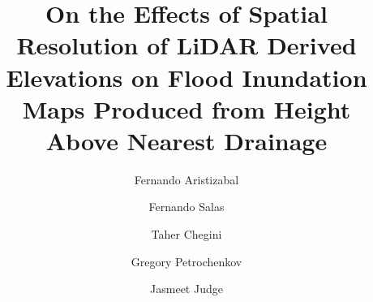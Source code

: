 \documentclass[preprint,review,12pt]{dependencies/elsarticle}
\begin{document}
%
\begin{frontmatter}
%
%


\title{On the Effects of Spatial Resolution of LiDAR Derived Elevations on Flood Inundation Maps Produced from Height Above Nearest Drainage}


\author[lynk,nwc,uf]{Fernando Aristizabal}

\author[nwc]{Fernando Salas}
\author[uh]{Taher Chegini}
\author[usgs]{Gregory Petrochenkov}
\author[uf]{Jasmeet Judge}
%
%


\end{frontmatter}
\end{document}
